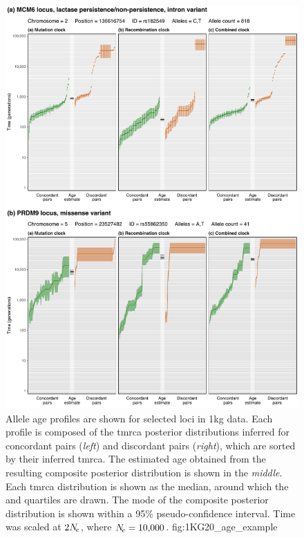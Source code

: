

\begin{figure}[p]
\centering
\vspace*{-10pt}
\includegraphics[width=\textwidth]{./img/ch5/1KG20_age_example}
%
{Allele age profiles are shown for  selected loci in \gls{1kg} data.
Each profile is composed of the \gls{tmrca} posterior distributions inferred for concordant pairs (\emph{left}) and discordant pairs (\emph{right}), which are sorted by their inferred \gls{tmrca}.
The estimated age obtained from the resulting composite posterior distribution is shown in the \emph{middle}.
Each \gls{tmrca} distribution is shown as the median, around which the  and  quartiles are drawn.
The mode of the composite posterior distribution is shown within a 95\% pseudo-confidence interval.
Time was scaled at $2N_{\!e}$, where ${\Ne=\n{10000}}$.}%
{fig:1KG20_age_example}
\end{figure}
